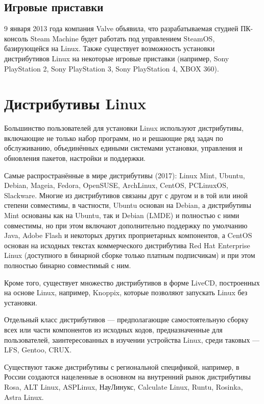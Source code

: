 \section*{Игровые приставки}
9 января 2013 года компания Valve объявила, что разрабатываемая студией ПК-консоль Steam Machine будет работать под управлением SteamOS, базирующейся на Linux. Также существует возможность установки дистрибутивов Linux на некоторые игровые приставки (например, Sony PlayStation 2, Sony PlayStation 3, Sony PlayStation 4, XBOX 360). 

\chapter*{Дистрибутивы Linux}

Большинство пользователей для установки Linux используют дистрибутивы, включающие не только набор программ, но и решающие ряд задач по обслуживанию, объединённых едиными системами установки, управления и обновления пакетов, настройки и поддержки.

Самые распространённые в мире дистрибутивы (2017): Linux Mint, Ubuntu, Debian, Mageia, Fedora, OpenSUSE, ArchLinux, CentOS, PCLinuxOS, Slackware. Многие из дистрибутивов связаны друг с другом и в той или иной степени совместимы, в частности, Ubuntu основан на Debian, а дистрибутивы Mint основаны как на Ubuntu, так и Debian (LMDE) и полностью с ними совместимы, но при этом включают дополнительно поддержку по умолчанию Java, Adobe Flash и некоторых других проприетарных компонентов, а CentOS основан на исходных текстах коммерческого дистрибутива Red Hat Enterprise Linux (доступного в бинарной сборке только платным подписчикам) и при этом полностью бинарно совместимый с ним.

Кроме того, существует множество дистрибутивов в форме LiveCD, построенных на основе Linux, например, Knoppix, которые позволяют запускать Linux без установки.

Отдельный класс дистрибутивов — предполагающие самостоятельную сборку всех или части компонентов из исходных кодов, предназначенные для пользователей, заинтересованных в изучении устройства Linux, среди таковых — LFS, Gentoo, CRUX.

Существуют также дистрибутивы с региональной спецификой, например, в России создаются нацеленные в основном на внутренний рынок дистрибутивы Rosa, ALT Linux, ASPLinux, НауЛинукс, Calculate Linux, Runtu, Rosinka, Astra Linux.

